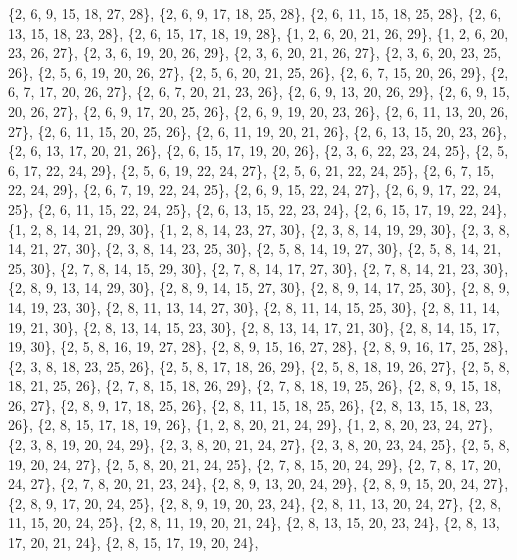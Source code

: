 \documentclass[11pt,a4paper]{article}
\begin{document}
{\{2, 6, 9, 15, 18, 27, 28\}, \{2, 6, 9, 17, 18, 25, 28\}, \{2, 6, 11, 15, 18, 25, 28\}, \{2, 6, 13, 15, 18, 23, 28\}, \{2, 6, 15, 17, 18, 19, 28\},
\{1, 2, 6, 20, 21, 26, 29\}, \{1, 2, 6, 20, 23, 26, 27\}, \{2, 3, 6, 19, 20, 26, 29\}, \{2, 3, 6, 20, 21, 26, 27\}, \{2, 3, 6, 20, 23, 25, 26\},
\{2, 5, 6, 19, 20, 26, 27\}, \{2, 5, 6, 20, 21, 25, 26\}, \{2, 6, 7, 15, 20, 26, 29\}, \{2, 6, 7, 17, 20, 26, 27\}, \{2, 6, 7, 20, 21, 23, 26\},
\{2, 6, 9, 13, 20, 26, 29\}, \{2, 6, 9, 15, 20, 26, 27\}, \{2, 6, 9, 17, 20, 25, 26\}, \{2, 6, 9, 19, 20, 23, 26\}, \{2, 6, 11, 13, 20, 26, 27\},
\{2, 6, 11, 15, 20, 25, 26\}, \{2, 6, 11, 19, 20, 21, 26\}, \{2, 6, 13, 15, 20, 23, 26\}, \{2, 6, 13, 17, 20, 21, 26\}, \{2, 6, 15, 17, 19, 20, 26\},
\{2, 3, 6, 22, 23, 24, 25\}, \{2, 5, 6, 17, 22, 24, 29\}, \{2, 5, 6, 19, 22, 24, 27\}, \{2, 5, 6, 21, 22, 24, 25\}, \{2, 6, 7, 15, 22, 24, 29\},
\{2, 6, 7, 19, 22, 24, 25\}, \{2, 6, 9, 15, 22, 24, 27\}, \{2, 6, 9, 17, 22, 24, 25\}, \{2, 6, 11, 15, 22, 24, 25\}, \{2, 6, 13, 15, 22, 23, 24\},
\{2, 6, 15, 17, 19, 22, 24\}, \{1, 2, 8, 14, 21, 29, 30\}, \{1, 2, 8, 14, 23, 27, 30\}, \{2, 3, 8, 14, 19, 29, 30\}, \{2, 3, 8, 14, 21, 27, 30\},
\{2, 3, 8, 14, 23, 25, 30\}, \{2, 5, 8, 14, 19, 27, 30\}, \{2, 5, 8, 14, 21, 25, 30\}, \{2, 7, 8, 14, 15, 29, 30\}, \{2, 7, 8, 14, 17, 27, 30\},
\{2, 7, 8, 14, 21, 23, 30\}, \{2, 8, 9, 13, 14, 29, 30\}, \{2, 8, 9, 14, 15, 27, 30\}, \{2, 8, 9, 14, 17, 25, 30\}, \{2, 8, 9, 14, 19, 23, 30\},
\{2, 8, 11, 13, 14, 27, 30\}, \{2, 8, 11, 14, 15, 25, 30\}, \{2, 8, 11, 14, 19, 21, 30\}, \{2, 8, 13, 14, 15, 23, 30\}, \{2, 8, 13, 14, 17, 21, 30\},
\{2, 8, 14, 15, 17, 19, 30\}, \{2, 5, 8, 16, 19, 27, 28\}, \{2, 8, 9, 15, 16, 27, 28\}, \{2, 8, 9, 16, 17, 25, 28\}, \{2, 3, 8, 18, 23, 25, 26\},
\{2, 5, 8, 17, 18, 26, 29\}, \{2, 5, 8, 18, 19, 26, 27\}, \{2, 5, 8, 18, 21, 25, 26\}, \{2, 7, 8, 15, 18, 26, 29\}, \{2, 7, 8, 18, 19, 25, 26\},
\{2, 8, 9, 15, 18, 26, 27\}, \{2, 8, 9, 17, 18, 25, 26\}, \{2, 8, 11, 15, 18, 25, 26\}, \{2, 8, 13, 15, 18, 23, 26\}, \{2, 8, 15, 17, 18, 19, 26\},
\{1, 2, 8, 20, 21, 24, 29\}, \{1, 2, 8, 20, 23, 24, 27\}, \{2, 3, 8, 19, 20, 24, 29\}, \{2, 3, 8, 20, 21, 24, 27\}, \{2, 3, 8, 20, 23, 24, 25\},
\{2, 5, 8, 19, 20, 24, 27\}, \{2, 5, 8, 20, 21, 24, 25\}, \{2, 7, 8, 15, 20, 24, 29\}, \{2, 7, 8, 17, 20, 24, 27\}, \{2, 7, 8, 20, 21, 23, 24\},
\{2, 8, 9, 13, 20, 24, 29\}, \{2, 8, 9, 15, 20, 24, 27\}, \{2, 8, 9, 17, 20, 24, 25\}, \{2, 8, 9, 19, 20, 23, 24\}, \{2, 8, 11, 13, 20, 24, 27\},
\{2, 8, 11, 15, 20, 24, 25\}, \{2, 8, 11, 19, 20, 21, 24\}, \{2, 8, 13, 15, 20, 23, 24\}, \{2, 8, 13, 17, 20, 21, 24\}, \{2, 8, 15, 17, 19, 20, 24\},
}
\end{document}
